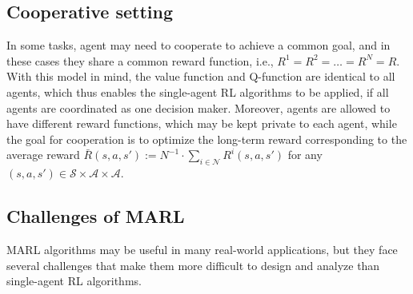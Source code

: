 \subsection{Cooperative setting}

In some tasks, agent may need to cooperate to achieve a common goal, and in these cases they share a common reward function, i.e., $R^1 = R^2 = \dots = R^N = R$. 
With this model in mind, the value function and Q-function are identical to all agents, which thus enables the single-agent RL algorithms to be applied, if all agents are coordinated as one decision maker. 
Moreover, agents are allowed to have different reward functions, which may be kept private to each agent, while the goal for cooperation is to optimize the long-term reward corresponding to the average reward $\bar{R}(s,a,s') := N^{-1}\cdot\sum_{i\in\mathcal{N}}R^i(s,a,s')$ for any $(s,a,s')\in\mathcal{S}\times\mathcal{A}\times\mathcal{A}$. 

\subsection{Challenges of MARL}

MARL algorithms may be useful in many real-world applications, but they face several challenges that make them more difficult to design and analyze than single-agent RL algorithms.

